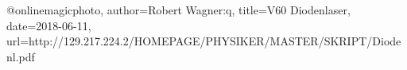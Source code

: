 @online{magicphoto,
    author={Robert Wagner:q},
    title={V60 Diodenlaser},
    date={2018-06-11},
    url={http://129.217.224.2/HOMEPAGE/PHYSIKER/MASTER/SKRIPT/Diodenl.pdf}
}
